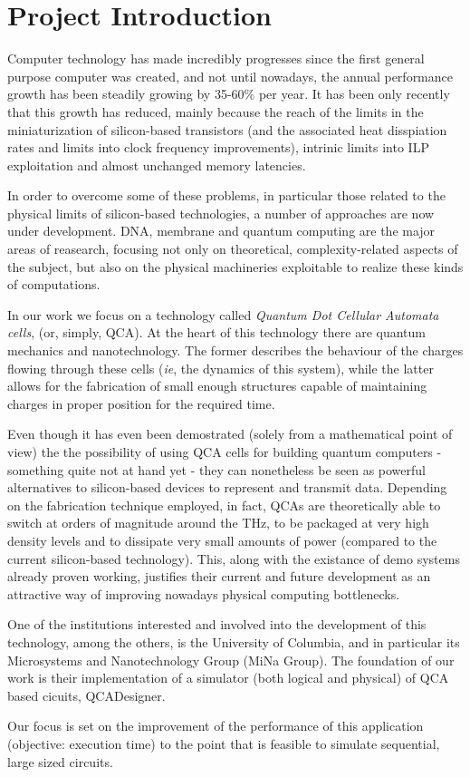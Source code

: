 \chapter{Project Introduction}\label{sec:intro}
Computer technology has made incredibly progresses since the first general purpose computer was created, and not until nowadays, the annual performance growth has been steadily growing by 35-60\% per year. It has been only recently that this growth has reduced, mainly because the reach of the limits in the miniaturization of silicon-based transistors (and the associated heat disspiation rates and limits into clock frequency improvements), intrinic limits into ILP exploitation and almost unchanged memory latencies. 

In order to overcome some of these problems, in particular those related to the physical limits of silicon-based technologies, a number of approaches are now under development. DNA, membrane and quantum computing are the major areas of reasearch, focusing not only on theoretical, complexity-related aspects of the subject, but also on the physical machineries exploitable to realize these kinds of computations.

In our work we focus on a technology called \textsl{Quantum Dot Cellular Automata cells}, (or, simply, QCA). At the heart of this technology there are quantum mechanics and nanotechnology. The former describes the behaviour of the charges flowing through these cells (\textsl{ie}, the dynamics of this system), while the latter allows for the fabrication of small enough structures capable of maintaining charges in proper position for the required time. 

Even though it has even been demostrated (solely from a mathematical point of view) the the possibility of using QCA cells for building quantum computers - something quite not at hand yet - they can nonetheless be seen as powerful alternatives to silicon-based devices to represent and transmit data. Depending on the fabrication technique employed, in fact, QCAs are theoretically able to switch at orders of magnitude around the THz, to be packaged at very high density levels and to dissipate very small amounts of power (compared to the current silicon-based technology). This, along with the existance of demo systems already proven working, justifies their current and future development as an attractive way of improving nowadays physical computing bottlenecks.

One of the institutions interested and involved into the development of this technology, among the others, is the University of Columbia, and in particular its Microsystems and Nanotechnology Group (MiNa Group). The foundation of our work is their implementation of a simulator (both logical and physical) of QCA based cicuits, QCADesigner. 

Our focus is set on the improvement of the performance of this application (objective: execution time) to the point that is feasible to simulate sequential, large sized circuits.

